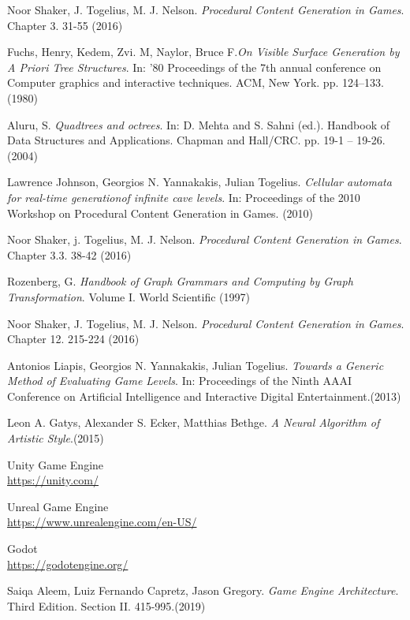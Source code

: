 \begin{thebibliography}{9}
 Noor Shaker, J. Togelius, M. J. Nelson. \textit{Procedural Content Generation in Games}. Chapter 3. 31-55 (2016)

 Fuchs, Henry, Kedem, Zvi. M, Naylor, Bruce F.\textit{On Visible Surface Generation by A Priori Tree Structures}. In: '80 Proceedings of the 7th annual conference on Computer graphics and interactive techniques. ACM, New York. pp. 124–133. (1980)

 Aluru, S. \textit{Quadtrees and octrees}. In: D. Mehta and S. Sahni (ed.). Handbook of Data Structures and Applications. Chapman and Hall/CRC. pp. 19-1 -- 19-26. (2004)

 Lawrence Johnson, Georgios N. Yannakakis, Julian Togelius. \textit{Cellular automata for real-time generationof infinite cave levels}. In: Proceedings of the 2010 Workshop on Procedural Content Generation in Games. (2010)

 Noor Shaker, j. Togelius, M. J. Nelson. \textit{Procedural Content Generation in Games}. Chapter 3.3. 38-42 (2016)

 Rozenberg, G. \textit{Handbook of Graph Grammars and Computing by Graph Transformation}. Volume I. World Scientific (1997)

 Noor Shaker, J. Togelius, M. J. Nelson. \textit{Procedural Content Generation in Games}. Chapter 12. 215-224 (2016)

 Antonios Liapis, Georgios N. Yannakakis, Julian Togelius. \textit{Towards a Generic Method of Evaluating Game Levels}. In:  Proceedings of the Ninth AAAI Conference on Artificial Intelligence and Interactive Digital Entertainment.(2013)

 Leon A. Gatys, Alexander S. Ecker, Matthias Bethge. \textit{A Neural Algorithm of Artistic Style}.(2015)

 Unity Game Engine \\
\href{https://unity.com/}{https://unity.com/}

 Unreal Game Engine \\
\href{https://www.unrealengine.com/en-US/}{https://www.unrealengine.com/en-US/}

 Godot \\
\href{https://godotengine.org/}{https://godotengine.org/}

 Saiqa Aleem, Luiz Fernando Capretz, Jason Gregory. \textit{Game Engine Architecture}. Third Edition. Section II. 415-995.(2019)


\end{thebibliography}
